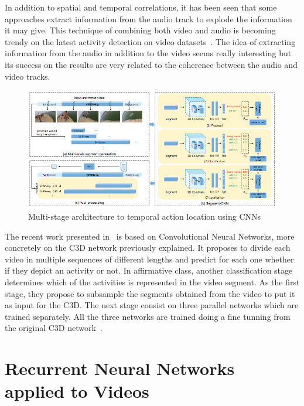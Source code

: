 In addition to spatial and temporal correlations, it has been seen that some approaches extract information from the audio track to explode the information it may give. This technique of combining both video and audio is becoming trendy on the latest activity detection on video datasets~\cite{xu2015uts}. The idea of extracting information from the audio in addition to the video seems really interesting but its success on the results are very related to the coherence between the audio and video tracks.

\begin{figure}[ht]
\begin{center}
\includegraphics[width=1\linewidth]{img/stateofart/multistage}
\end{center}
\caption{Multi-stage architecture to temporal action location using CNNs}
\label{fig:multistage}
\end{figure}

The recent work presented in~\cite{shoutemporal} is based on Convolutional Neural Networks, more concretely on the C3D network previously explained. It proposes to divide each video in multiple sequences of different lengths and predict for each one whether if they depict an activity or not. In affirmative class, another classification stage determines which of the activities is represented in the video segment. As the first stage, they propose to subsample the segments obtained from the video to put it as input for the C3D. The next stage consist on three parallel networks which are trained separately. All the three networks are trained doing a fine tunning from the original C3D network~\cite{tran2014learning}.

\section{Recurrent Neural Networks applied to Videos}

